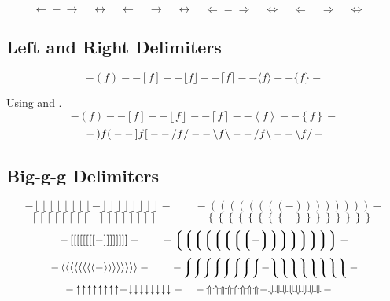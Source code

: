 \begin{displaymath}
  \leftarrow \mathrel{-} \rightarrow \quad
  \leftrightarrow \quad
  \longleftarrow  \quad
  \longrightarrow \quad
  \longleftrightarrow \quad
  \Leftarrow = \Rightarrow \quad
  \Leftrightarrow \quad
  \Longleftarrow  \quad
  \Longrightarrow \quad
  \Longleftrightarrow \quad
\end{displaymath}


\subsection{Left and Right Delimiters \showfamily}

\def\testdelim#1#2{ - #1 f #2 - }
\begin{displaymath}
  \testdelim()
  \testdelim[]
  \testdelim\lfloor\rfloor
  \testdelim\lceil\rceil
  \testdelim\langle\rangle
  \testdelim\{\}
\end{displaymath}

Using {\tt\string\left} and {\tt\string\right}.
\def\testdelim#1#2{ - \left#1 f \right#2 - }
\begin{displaymath}
  \testdelim()
  \testdelim[]
  \testdelim\lfloor\rfloor
  \testdelim\lceil\rceil
  \testdelim\langle\rangle
  \testdelim\{\}
\end{displaymath}
\begin{displaymath}
  \testdelim)(
  \testdelim][
  \testdelim//
  \testdelim\backslash\backslash
  \testdelim/\backslash
  \testdelim\backslash/
\end{displaymath}


\subsection{Big-g-g Delimiters \showfamily}

\def\testdelim#1#2{%
  - \left#1\left#1\left#1\left#1\left#1\left#1\left#1\left#1 -
  \right#2\right#2\right#2\right#2\right#2\right#2\right#2\right#2 -}

\begingroup
\delimitershortfall-1pt
\begin{displaymath}
  \testdelim\lfloor\rfloor
  \qquad
  \testdelim()
\end{displaymath}
\begin{displaymath}
  \testdelim\lceil\rceil
  \qquad
  \testdelim\{\}
\end{displaymath}
\begin{displaymath}
  \testdelim[]
  \qquad
  \testdelim\lgroup\rgroup
\end{displaymath}
\begin{displaymath}
  \testdelim\langle\rangle
  \qquad
  \testdelim\lmoustache\rmoustache
\end{displaymath}
\begin{displaymath}
  \testdelim\uparrow\downarrow \quad
  \testdelim\Uparrow\Downarrow \quad
\end{displaymath}
\endgroup %

